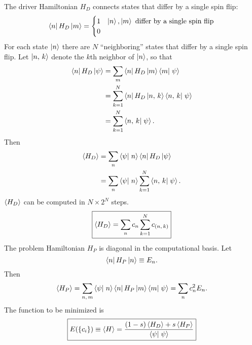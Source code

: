 The driver Hamiltonian $H_D$ connects states that differ by a single spin flip:
\begin{equation}
  \matrixel{n}{H_D}{m}
  = \begin{cases}
    1 & \ket{n}, \ket{m} \text{ differ by a single spin flip} \\
    0
  \end{cases}
  \label{}
\end{equation}
For each state $\left| n \right>$ there are $N$ ``neighboring'' states that differ by a
single spin flip. Let $\left| n,\,k \right>$ denote the $k$th neighbor of
$\left| n \right>$, so that
\begin{align}
  \matrixel{n}{H_D}{\psi}
  &= \sum_m \matrixel{n}{H_D}{m} \braket{m}{\psi} \\
  &= \sum_{k=1}^N \matrixel{n}{H_D}{\nghbr{n}{k}} \braket{\nghbr{n}{k}}{\psi} \\
  &= \sum_{k=1}^N \braket{\nghbr{n}{k}}{\psi}.
  \label{}
\end{align}
Then
\begin{align}
  \avg{H_D}
  &= \sum_n \braket{\psi}{n} \matrixel{n}{H_D}{\psi} \\
  &= \sum_n \braket{\psi}{n} \sum_{k=1}^{N} \braket{\nghbr{n}{k}}{\psi}.
  \label{}
\end{align}
$\left< H_D \right>$ can be computed in $N \times 2^N$ steps.
\begin{equation}
  \boxed{
    \left< H_D \right> = \sum_n c_n \sum_{k=1}^N c_{(n,\,k)}
  }
  \label{}
\end{equation}
The problem Hamiltonian $H_P$ is diagonal in the computational basis. Let
\begin{equation}
  \matrixel{n}{H_P}{n} \equiv E_n.
  \label{}
\end{equation}
Then
\begin{equation}
  \avg{H_P}
  = \sum_{n,\,m} \braket{\psi}{n} \matrixel{n}{H_P}{m} \braket{m}{\psi}
  = \sum_n c_n^2 E_n.
  \label{}
\end{equation}
The function to be minimized is
\begin{equation}
  \boxed{
  E( \{ c_i \})
  \equiv \avg{H}
  = \frac{(1-s) \avg{H_D} + s \avg{H_P}}{\braket{\psi}{\psi}}
  }
  \label{}
\end{equation}
